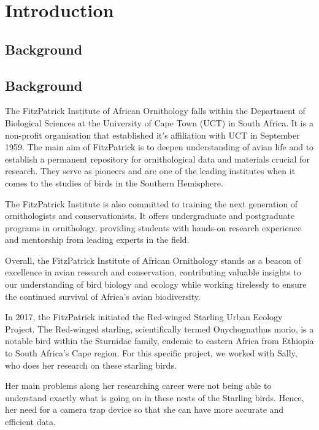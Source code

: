 \documentclass[class=report,11pt,crop=false]{standalone}
\begin{document}
\chapter{Introduction \label{ch:introduction}}



\section{Background}
\section{Background}
The FitzPatrick Institute of African Ornithology falls within the Department of Biological Sciences at the University of Cape Town (UCT) in South Africa. It is a non-profit organisation that established it’s affiliation with UCT in September 1959. The main aim of FitzPatrick is to deepen understanding of avian life and to establish a permanent repository for ornithological data and materials crucial for research. They serve as pioneers and are one of the leading institutes when it comes to the studies of birds in the Southern Hemisphere.
\newline

The FitzPatrick Institute is also committed to training the next generation of ornithologists and conservationists. It offers undergraduate and postgraduate programs in ornithology, providing students with hands-on research experience and mentorship from leading experts in the field.
\newline

Overall, the FitzPatrick Institute of African Ornithology stands as a beacon of excellence in avian research and conservation, contributing valuable insights to our understanding of bird biology and ecology while working tirelessly to ensure the continued survival of Africa's avian biodiversity.
\newline

In 2017, the FitzPatrick initiated the Red-winged Starling Urban Ecology Project. The Red-winged starling, scientifically termed Onychognathus morio, is a notable bird within the Sturnidae family, endemic to eastern Africa from Ethiopia to South Africa's Cape region. For this specific project, we worked with Sally, who does her research on these starling birds.
\newline

Her main problems along her researching career were not being able to understand exactly what is going on in these nests of the Starling birds. Hence, her need for a camera trap device so that she can have more accurate and efficient data.
\end{document}
